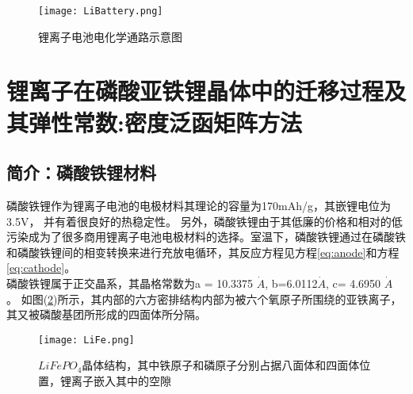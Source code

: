 \begin{figure}
\centering   
\texttt{[image: LiBattery.png]}
\caption{锂离子电池电化学通路示意图} 
\label{fig:LiBattery}
\end{figure}
\section{锂离子在磷酸亚铁锂晶体中的迁移过程及其弹性常数:密度泛函矩阵方法}
\subsection{简介：磷酸铁锂材料}
磷酸铁锂作为锂离子电池的电极材料其理论的容量为170mAh/g，其嵌锂电位为3.5V， 并有着很良好的热稳定性。 另外，磷酸铁锂由于其低廉的价格和相对的低污染成为了很多商用锂离子电池电极材料的选择。室温下，磷酸铁锂通过在磷酸铁和磷酸铁锂间的相变转换来进行充放电循环，其反应方程见方程\ref{eq:anode}和方程\ref{eq:cathode}。\\
\indent 磷酸铁锂属于正交晶系，其晶格常数为a = 10.3375 $\dot{A}$, b=6.0112$\dot{A}$, c= 4.6950 $\dot{A}$ 。 如图(\ref{fig:LiFe})所示，其内部的六方密排结构内部为被六个氧原子所围绕的亚铁离子，其又被磷酸基团所形成的四面体所分隔。
\begin{figure}
\centering   
\texttt{[image: LiFe.png]}
\caption{$LiFePO_4$晶体结构，其中铁原子和磷原子分别占据八面体和四面体位置，锂离子嵌入其中的空隙\cite{Zhang2011Structure}} 
\label{fig:LiFe}
\end{figure}
